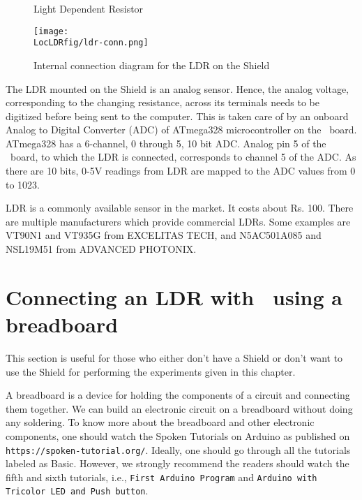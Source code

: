 \begin{figure}
  \centering
   \hfill
  \caption{Light Dependent Resistor}
\end{figure}

\begin{figure}
  \centering
  \texttt{[image: \\LocLDRfig/ldr-conn.png]}
  \caption{Internal connection diagram for the LDR on the Shield}
  \label{fig:ldrconn}
\end{figure}

The LDR mounted on the Shield is an analog sensor. Hence, the analog voltage, corresponding to the changing resistance, across its terminals needs to be digitized before being sent to the computer. This is taken care of by an onboard Analog to Digital Converter (ADC) of ATmega328 microcontroller on the \arduino\
board. ATmega328 has a 6-channel, 0 through 5, 10 bit ADC. Analog pin
5 of the \arduino\ board, to which the LDR is connected, corresponds
to channel 5 of the ADC.  As there are 10 bits, 0-5V readings from LDR
are mapped to the ADC values from 0 to 1023. 

LDR is a commonly available sensor in the market. It costs about
Rs. 100. There are multiple manufacturers which provide commercial
LDRs.  Some examples are VT90N1 and VT935G from EXCELITAS TECH, and
N5AC501A085 and NSL19M51 from ADVANCED PHOTONIX. 

\section{Connecting an LDR with \arduino\ using a breadboard}
This section is useful for those who either don't have a Shield or don't want to use the Shield
for performing the experiments given in this chapter.

A breadboard is a device for holding the components of a circuit and connecting 
them together. We can build an electronic circuit on a breadboard without doing any 
soldering. To know more about the breadboard and other electronic components, 
one should watch the Spoken Tutorials on Arduino as published on
  {\tt https://spoken-tutorial.org/}. Ideally, one should go through all the
tutorials labeled as Basic. However, we strongly recommend the readers should
watch the fifth and sixth tutorials, i.e., {\tt First Arduino Program} and 
  {\tt Arduino with Tricolor LED and Push button}.

